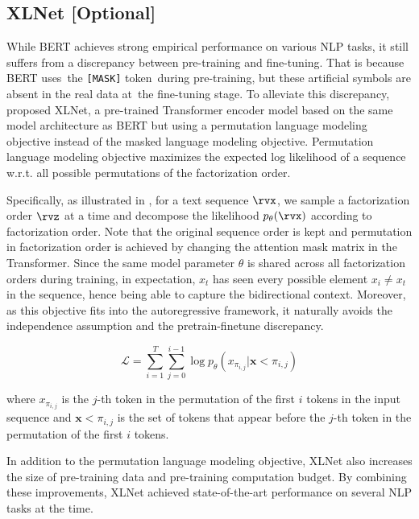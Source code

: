 \subsection*{XLNet [Optional]}
While BERT achieves strong empirical performance on various NLP tasks, it still suffers from a discrepancy between pre-training and fine-tuning. That is because BERT uses the \texttt{[MASK]} token during pre-training, but these artificial symbols are absent in the real data at the fine-tuning stage. To alleviate this discrepancy, \citet{xnlnet} proposed XLNet, a pre-trained Transformer encoder model based on the same model architecture as BERT but using a permutation language modeling objective instead of the masked language modeling objective. Permutation language modeling objective maximizes the expected log likelihood of a sequence w.r.t. all possible permutations of the factorization order.

Specifically, as illustrated in , for a text sequence $\rvx$, we sample a factorization order $\rvz$ at a time and decompose the likelihood $p_\theta(\rvx)$ according to factorization order. Note that the original sequence order is kept and permutation in factorization order is achieved by changing the attention mask matrix in the Transformer.
Since the same model parameter $\theta$ is shared across all factorization orders during training, in expectation, $x_t$ has seen every possible element $x_i \neq x_t$ in the sequence, hence being able to capture the bidirectional context. Moreover, as this objective fits into the autoregressive framework, it naturally avoids the independence assumption and the pretrain-finetune discrepancy.

\begin{equation}
\mathcal{L} = \sum_{i=1}^{T}\sum_{j=0}^{i-1}\log p_{\theta}(x_{\pi_{i,j}} | \boldsymbol{x}{<\pi_{i,j}}) 
\end{equation}

where $x_{\pi_{i,j}}$ is the $j$-th token in the permutation of the first $i$ tokens in the input sequence and $\boldsymbol{x}{<\pi_{i,j}}$ is the set of tokens that appear before the $j$-th token in the permutation of the first $i$ tokens.

In addition to the permutation language modeling objective, XLNet also increases the size of pre-training data and pre-training computation budget. By combining these improvements, XLNet achieved state-of-the-art performance on several NLP tasks at the time.

